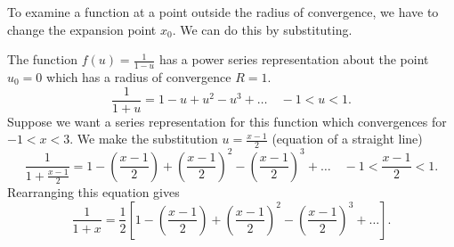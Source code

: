 \documentclass[../multivariate_calculus.tex]{subfiles}
\begin{document}
        To examine a function at a point outside the radius of convergence, we have to change the expansion point $x_0$.
        We can do this by substituting.
        \begin{example}
            The function $f(u)=\frac{1}{1-u}$ has a power series representation about the point $u_0=0$ which has a radius of convergence $R=1$.
            \begin{equation}
                \frac{1}{1+u}=1-u+u^2-u^3+\dots\quad-1<u<1.
            \end{equation}
            Suppose we want a series representation for this function which convergences for $-1<x<3$.
            We make the substitution $u=\frac{x-1}{2}$ (equation of a straight line)
            \begin{equation}
                \frac{1}{1+\frac{x-1}{2}}=1-\left(\frac{x-1}{2}\right)+\left(\frac{x-1}{2}\right)^2-\left(\frac{x-1}{2}\right)^3+\dots\quad-1<\frac{x-1}{2}<1.
            \end{equation}
            Rearranging this equation gives
            \begin{equation}
                \frac{1}{1+x}=\frac{1}{2}\left[1-\left(\frac{x-1}{2}\right)+\left(\frac{x-1}{2}\right)^2-\left(\frac{x-1}{2}\right)^3+\dots\right].
            \end{equation}
        \end{example}
\end{document}
